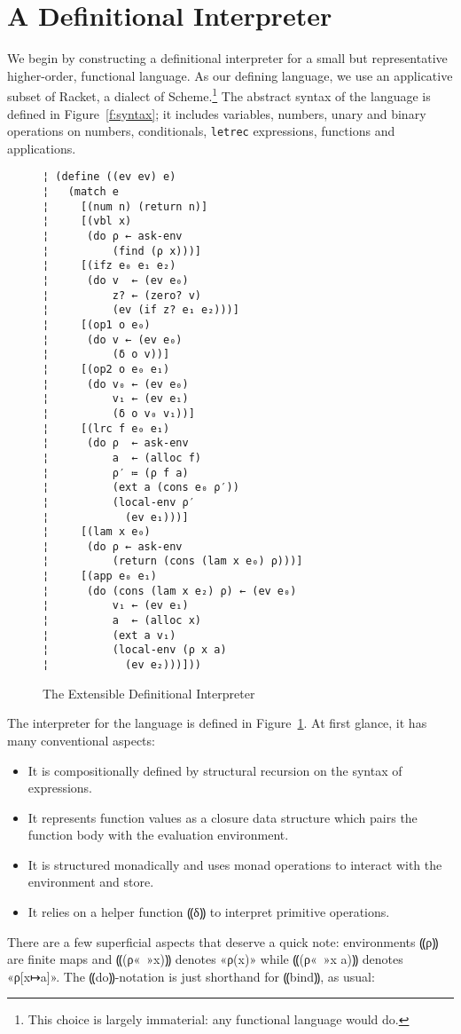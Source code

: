 \section{A Definitional Interpreter}\label{s:interp}

We begin by constructing a definitional interpreter for a small but
representative higher-order, functional language.  As our defining language, we
use an applicative subset of Racket, a dialect of Scheme.\footnote{This choice
is largely immaterial: any functional language would do.} The abstract syntax
of the language is defined in Figure~\ref{f:syntax}; it includes variables,
numbers, unary and binary operations on numbers, conditionals, {\tt letrec}
expressions, functions and applications.

\begin{figure} %
\begin{lstlisting}
¦ (define ((ev ev) e)
¦   (match e
¦     [(num n) (return n)]
¦     [(vbl x)
¦      (do ρ ← ask-env
¦          (find (ρ x)))]    
¦     [(ifz e₀ e₁ e₂) 
¦      (do v  ← (ev e₀)
¦          z? ← (zero? v)
¦          (ev (if z? e₁ e₂)))]
¦     [(op1 o e₀)
¦      (do v ← (ev e₀)
¦          (δ o v))]   
¦     [(op2 o e₀ e₁)
¦      (do v₀ ← (ev e₀)
¦          v₁ ← (ev e₁)
¦          (δ o v₀ v₁))]
¦     [(lrc f e₀ e₁) 
¦      (do ρ  ← ask-env
¦          a  ← (alloc f)
¦          ρ′ ≔ (ρ f a)
¦          (ext a (cons e₀ ρ′))
¦          (local-env ρ′
¦            (ev e₁)))]
¦     [(lam x e₀)
¦      (do ρ ← ask-env
¦          (return (cons (lam x e₀) ρ)))]
¦     [(app e₀ e₁)
¦      (do (cons (lam x e₂) ρ) ← (ev e₀)
¦          v₁ ← (ev e₁)
¦          a  ← (alloc x)         
¦          (ext a v₁)
¦          (local-env (ρ x a) 
¦            (ev e₂)))]))
\end{lstlisting}
\caption{The Extensible Definitional Interpreter}
\label{f:interpreter}
\end{figure} %

The interpreter for the language is defined in Figure~\ref{f:interpreter}. At
first glance, it has many conventional aspects:
\begin{itemize}
\item It is compositionally defined by structural recursion on the syntax of
expressions.
\item It represents function values as a closure data structure which pairs the
function body with the evaluation environment.
\item It is structured monadically and uses monad operations to interact with
the environment and store.
\item It relies on a helper function ⸨δ⸩ to interpret primitive operations.
\end{itemize}
There are a few superficial aspects that deserve a quick note:
environments ⸨ρ⸩ are finite maps and ⸨(ρ«\ »x)⸩ denotes
«ρ(x)» while ⸨(ρ«\ »x a)⸩ denotes «ρ[x↦a]».  The
⸨do⸩-notation is just shorthand for ⸨bind⸩, as usual:

